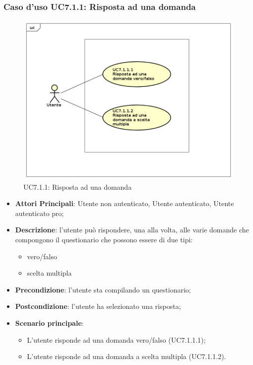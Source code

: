 \subsubsection{Caso d'uso UC7.1.1: Risposta ad una domanda}
\label{UC7.1.1}
\begin{figure}[h]
\centering
\includegraphics[scale=0.5,keepaspectratio]{UML/UC7_1_1.png}
\caption{UC7.1.1: Risposta ad una domanda}
\end{figure}
\FloatBarrier
\begin{itemize}
\item\textbf{Attori Principali}: Utente non autenticato, Utente autenticato, Utente autenticato pro;
\item\textbf{Descrizione}: l'utente può rispondere, una alla volta, alle varie domande che compongono il questionario che possono essere di due tipi:
\begin{itemize}
\item vero/falso
\item scelta multipla
\end{itemize}
\item\textbf{Precondizione}: l'utente sta compilando un questionario;
\item\textbf{Postcondizione}: l'utente ha selezionato una risposta;
\item\textbf{Scenario principale}: 
\begin{itemize}
\item L'utente risponde ad una domanda vero/falso (UC7.1.1.1);
\item L'utente risponde ad una domanda a scelta multipla (UC7.1.1.2).
\end{itemize}
\end{itemize}

